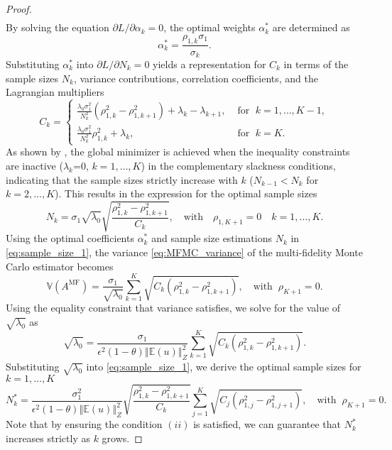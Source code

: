 \begin{proof}
\begin{align*}
\end{align*}
%
By solving the equation $\partial L/\partial \alpha_k=0$, the optimal weights $\alpha_k^*$ are determined as
%
\[
\alpha_k^*=\frac{\rho_{1,k}\sigma_1}{\sigma_k}.
\]
%
Substituting $\alpha_k^*$ into $\partial L/\partial N_k=0$ yields a representation for $C_k$ in terms of the sample sizes $N_k$, variance contributions, correlation coefficients, and the Lagrangian multipliers
%
\begin{equation*}
    C_k=\left\{ \begin{array}{ll}
\frac{\lambda_0\sigma_1^2}{N_k^2}\left(\rho_{1,k}^2-\rho_{1,k+1}^2\right)+\lambda_k-\lambda_{k+1}, & \text{ for }\; k=1,\ldots,K-1, \\
\frac{\lambda_0\sigma_1^2}{N_k^2}\rho_{1,k}^2+\lambda_k, & \text{ for }\; k=K.
\end{array}\right.
\end{equation*}
%
 As shown by  \cite{PeWiGu:2016}, the global minimizer is achieved when the inequality constraints are inactive ($\lambda_k$=0, $k=1,\dots, K$) in the complementary slackness conditions, indicating that the sample sizes strictly increase with $k$ ($N_{k-1}< N_k$ for $k=2,\ldots, K$). This results in the expression for the optimal sample sizes
\begin{equation}
\label{eq:sample_size_1}
    N_k = \sigma_1\sqrt{\lambda_0}\sqrt{\frac{\rho_{1,k}^2-\rho_{1,k+1}^2}{C_k}},\quad \text{with}\quad  \rho_{1,K+1}=0 \quad k=1,\ldots,K.
\end{equation}
Using the optimal coefficients $\alpha_k^*$ and sample size estimations $N_k$ in \eqref{eq:sample_size_1}, the variance \eqref{eq:MFMC_variance} of the multi-fidelity Monte Carlo estimator becomes
%
\begin{equation*} \label{eq:MFMC_variance2}
    \mathbb{V}\left(A^{\text{MF}}\right) = \frac{\sigma_1}{\sqrt{\lambda_0}}\sum_{k=1}^K\sqrt{C_k\left(\rho_{1,k}^2-\rho_{1,k+1}^2\right)},\quad \text{with}\;\;\rho_{K+1}=0.
\end{equation*}
%
Using the equality constraint that variance satisfies,  we solve for the value of $\sqrt{\lambda_0}$ as
%
\[
\sqrt{\lambda_0} = \frac{\sigma_1}{\epsilon^2(1-\theta)\left\Vert\mathbb{E}(u) \right\Vert_{Z}^2}\sum_{k=1}^K\sqrt{C_k\left(\rho_{1,k}^2-\rho_{1,k+1}^2\right)}.
\]
%
Substituting $\sqrt{\lambda_0}$ into \eqref{eq:sample_size_1}, we derive the optimal sample sizes for $k=1,\ldots, K$
%
\[
N_k^* = \frac{\sigma_1^2}{\epsilon^2(1-\theta)\left\Vert\mathbb{E}(u) \right\Vert_{Z}^2}\sqrt{\frac{\rho_{1,k}^2-\rho_{1,k+1}^2}{C_k}}\sum_{j=1}^K\sqrt{C_j\left(\rho_{1,j}^2-\rho_{1,j+1}^2\right)},\quad \text{with}\;\;\rho_{K+1}=0.
\]
%
Note that by ensuring the condition $(ii)$ is satisfied, we can guarantee that $N_k^*$ increases strictly as $k$ grows. 
\end{proof}
